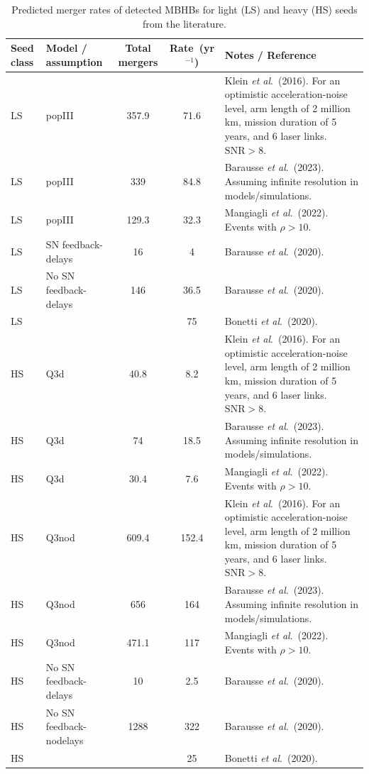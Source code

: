 \documentclass[a4paper,12pt]{article}
\begin{document}
\begin{table}[t]
\captionsetup{font=footnotesize}
\centering
\caption{Predicted merger rates of detected MBHBs for light (LS) and heavy (HS) seeds from the literature.}
\footnotesize
\renewcommand\arraystretch{1.12}
\begin{tabular}{@{} l l S[table-format=5.0] S[table-format=3.2] p{6.2cm} @{}}
\toprule
Seed class & Model / assumption & {Total mergers} & {Rate~(yr$^{-1}$)} & Notes / Reference \\
\midrule
LS & popIII         & 357.9 & 71.6 & Klein \textit{et al}.\ (2016). For an optimistic acceleration-noise level, arm length of 2 million km, mission duration of 5 years, and 6 laser links. $\mathrm{SNR}>8$.\\
LS &  popIII        & 339 & 84.8 & Barausse \textit{et al}.\ (2023). Assuming infinite resolution in models/simulations. \\
LS &  popIII        & 129.3 & 32.3 & Mangiagli \textit{et al}.\ (2022). Events with $\rho>10$. \\
LS & SN feedback-delays         & 16 & 4 & Barausse \textit{et al}.\ (2020). \\
LS & No SN feedback-delays         & 146 & 36.5 & Barausse \textit{et al}.\ (2020). \\
LS &          & & 75 & Bonetti \textit{et al}.\ (2020). \\
HS & Q3d         & 40.8 & 8.2  & Klein \textit{et al}.\ (2016). For an optimistic acceleration-noise level, arm length of 2 million km, mission duration of 5 years, and 6 laser links. $\mathrm{SNR}>8$.\\
HS &  Q3d        & 74 & 18.5 & Barausse \textit{et al}.\ (2023). Assuming infinite resolution in models/simulations.\\
HS &  Q3d        & 30.4 & 7.6 & Mangiagli \textit{et al}.\ (2022). Events with $\rho>10$. \\
HS & Q3nod        & 609.4 & 152.4 & Klein \textit{et al}.\ (2016). For an optimistic acceleration-noise level, arm length of 2 million km, mission duration of 5 years, and 6 laser links. $\mathrm{SNR}>8$.\\
HS &  Q3nod        & 656 & 164 & Barausse \textit{et al}.\ (2023). Assuming infinite resolution in models/simulations.\\
HS &  Q3nod        & 471.1 & 117 & Mangiagli \textit{et al}.\ (2022). Events with $\rho>10$. \\
HS & No SN feedback-delays         & 10 & 2.5 & Barausse \textit{et al}.\ (2020). \\
HS & No SN feedback-nodelays         & 1288 & 322 & Barausse \textit{et al}.\ (2020). \\
HS &          & & 25 & Bonetti \textit{et al}.\ (2020). \\
\bottomrule
\end{tabular}
\label{tab:detected_mergerrates_literature}
\end{table}
\end{document}
